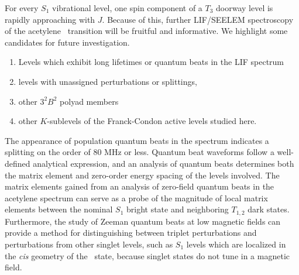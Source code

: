 \documentclass[12pt]{mitthesis}
\begin{document}
For every $S_1$ vibrational level, one spin component of a $T_3$
doorway level is rapidly approaching with $J$.  Because of this,
further LIF/SEELEM spectroscopy of the acetylene \AtoX\ transition
will be fruitful and informative.  We highlight some candidates for
future investigation.
\begin{enumerate}
\item Levels which exhibit long lifetimes or quantum beats in the LIF
  spectrum
\item levels with unassigned perturbations or splittings,
\item other $3^2B^2$ polyad members
\item other $K$-sublevels of the Franck-Condon active levels studied
  here.  
\end{enumerate}

The appearance of population quantum beats in the spectrum indicates a
splitting on the order of 80 MHz or less.  Quantum beat waveforms
follow a well-defined analytical expression, and an analysis of
quantum beats determines both the matrix element and zero-order energy
spacing of the levels involved.  The matrix elements gained from an
analysis of zero-field quantum beats in the acetylene spectrum can
serve as a probe of the magnitude of local matrix elements between the
nominal $S_1$ bright state and neighboring $T_{1,2}$ dark states.
Furthermore, the study of Zeeman quantum beats at low magnetic fields
can provide a method for distinguishing between triplet perturbations
and perturbations from other singlet levels, such as $S_1$ levels
which are localized in the \emph{cis} geometry of the \astate\ state,
because singlet states do not tune in a magnetic field.

 

\end{document}
